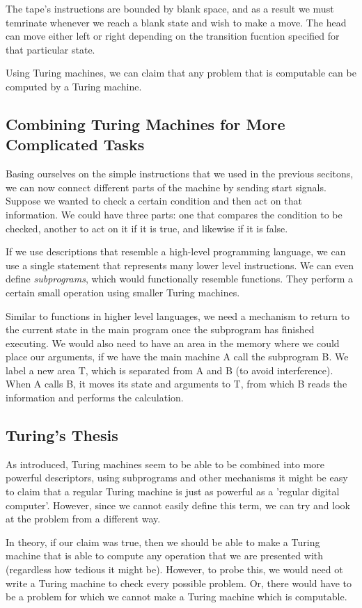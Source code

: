 \documentclass{article}
\begin{document}
The tape's instructions are bounded by blank space, and as a result we must temrinate whenever we 
reach a blank state and wish to make a move. The head can move either left or right depending on the
transition fucntion specified for that particular state.

Using Turing machines, we can claim that any problem that is computable can be computed by a 
Turing machine.
\subsection{Combining Turing  Machines for More Complicated Tasks}
Basing ourselves on the simple instructions that we used in the previous secitons, we can now 
connect different parts of the machine by sending start signals. Suppose we wanted to check a certain
condition and then act on that information. We could have three parts: one that compares the condition
to be checked, another to act on it if it is true, and likewise if it is false.

If we use descriptions that resemble a high-level programming language, we can use a single statement
that represents many lower level instructions. We can even define \textit{subprograms}, which would 
functionally resemble functions. They perform a certain small operation using smaller Turing machines.

Similar to functions in higher level languages, we need a mechanism to return to the current state in
the main program once the subprogram has finished executing. We would also need to have an area in the 
memory where we could place our arguments, if we have the main machine A call the subprogram B. We label
a new area T, which is separated from A and B (to avoid interference). When A calls B, it moves its 
state and arguments to T, from which B reads the information and performs the calculation.
\subsection{Turing's Thesis}
As introduced, Turing machines seem to be able to be combined into more powerful descriptors, using 
subprograms and other mechanisms it might be easy to claim that a regular Turing machine is just as
powerful as a 'regular digital computer'. However, since we cannot easily define this term, we can try
and look at the problem from a different way.

In theory, if our claim was true, then we should be able to make a Turing machine that is able to 
compute any operation that we are presented with (regardless how tedious it might be). However, to 
probe this, we would need ot write a Turing machine to check every possible problem. Or, there 
would have to be a problem for which we cannot make a Turing machine which is computable. 
\end{document}
